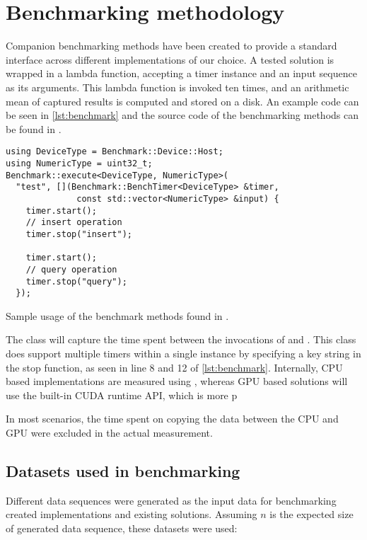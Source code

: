 \section{Benchmarking methodology}\label{section:benchmarking}

Companion benchmarking methods have been created to provide a standard interface across different implementations of our choice. A tested solution is wrapped in a lambda function, accepting a timer instance and an input sequence as its arguments. This lambda function is invoked ten times, and an arithmetic mean of captured results is computed and stored on a disk. An example code can be seen in \cref{lst:benchmark} and the source code of the benchmarking methods can be found in .

\begin{listing}
  \begin{verbatim}
using DeviceType = Benchmark::Device::Host;
using NumericType = uint32_t;
Benchmark::execute<DeviceType, NumericType>(
  "test", [](Benchmark::BenchTimer<DeviceType> &timer,
              const std::vector<NumericType> &input) {
    timer.start();
    // insert operation
    timer.stop("insert");

    timer.start();
    // query operation
    timer.stop("query");
  });
  \end{verbatim}
  \caption{Sample usage of the benchmark methods found in .}
  \label{lst:benchmark}
\end{listing}

The  class will capture the time spent between the invocations of  and . This class does support multiple timers within a single instance by specifying a key string in the stop function, as seen in line 8 and 12 of \cref{lst:benchmark}. Internally, CPU based implementations are measured using , whereas GPU based solutions will use the built-in CUDA runtime API, which is more p

In most scenarios, the time spent on copying the data between the CPU and GPU were excluded in the actual measurement.

\subsection{Datasets used in benchmarking}\label{subsection:benchmark:datasets}

Different data sequences were generated as the input data for benchmarking created implementations and existing solutions. Assuming $n$ is the expected size of generated data sequence, these datasets were used:

